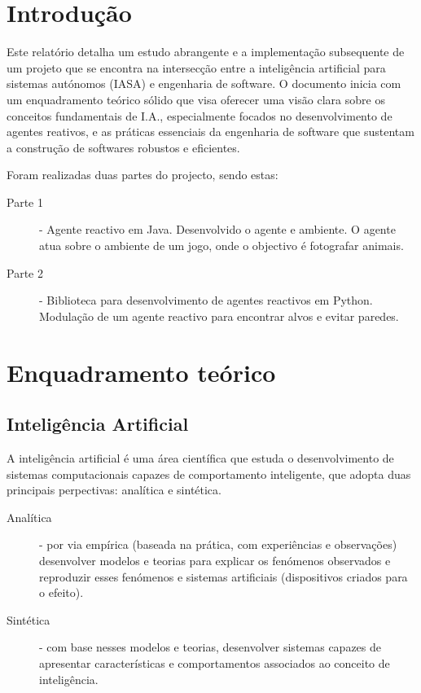 \documentclass[a4paper,12pt]{article}
\begin{document}


\newpage
\tableofcontents

\newpage
\listoffigures
\listoftables

\newpage
\section{Introdução}
Este relatório detalha um estudo abrangente e a implementação subsequente de um projeto que se encontra na intersecção entre a inteligência artificial para sistemas autónomos (IASA) e engenharia de software. 
O documento inicia com um enquadramento teórico sólido que visa oferecer uma visão clara sobre os conceitos fundamentais de I.A., especialmente focados no desenvolvimento de agentes reativos, e as práticas essenciais da engenharia de software que sustentam a construção de softwares robustos e eficientes.

Foram realizadas duas partes do projecto, sendo estas:
\begin{description}
	\item[Parte 1] - Agente reactivo em Java. Desenvolvido o agente e ambiente. O agente atua sobre o ambiente de um jogo, onde o objectivo é fotografar animais.
	\item[Parte 2] - Biblioteca para desenvolvimento de agentes reactivos em Python. Modulação de um agente reactivo para encontrar alvos e evitar paredes.
\end{description}
\newpage
\section{Enquadramento teórico}
\subsection{Inteligência Artificial}
A inteligência artificial é uma área científica que estuda o desenvolvimento de sistemas computacionais capazes de comportamento inteligente, que adopta duas principais perpectivas: analítica e sintética.
\begin{description}
	\item[Analítica] - por via empírica (baseada na prática, com experiências e observações) desenvolver modelos e teorias para explicar os fenómenos observados e reproduzir esses fenómenos e sistemas artificiais (dispositivos criados para o efeito).
	\item[Sintética] - com base nesses modelos e teorias, desenvolver sistemas capazes de apresentar características e comportamentos associados ao conceito de inteligência.
\end{description}
\end{document}
